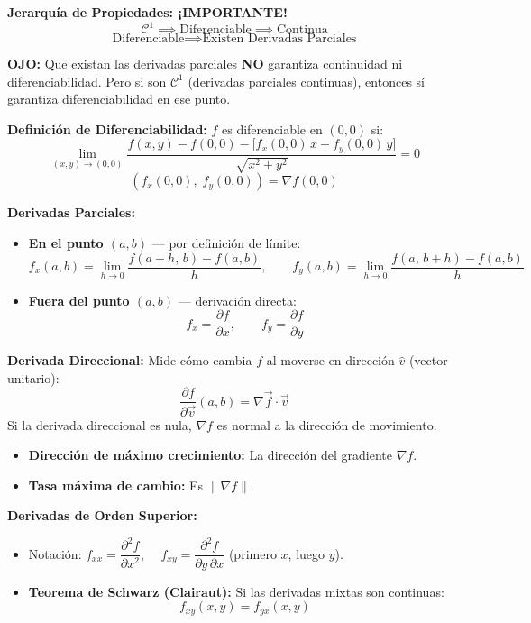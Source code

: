 \documentclass[letterpaper, 12pt]{article}
\newenvironment{seccionbox}[1]{%
    \begin{tcolorbox}[
        colback=celesteSuave,
        colframe=azulFuerte,
        coltitle=white,
        fonttitle=\bfseries\large,
        title=#1,
        arc=6pt,
        boxrule=1pt,
        breakable,
        enhanced,
        before upper={\parskip=4pt}
    ]
}{%
    \end{tcolorbox}
}
\newenvironment{notabox}{%
    \begin{tcolorbox}[
        colback=white,
        colframe=turquesaUsach,
        arc=4pt,
        boxrule=0.8pt,
        left=6pt, right=6pt, top=4pt, bottom=4pt
    ]
}{%
    \end{tcolorbox}
}
\begin{document}
\begin{seccionbox}{2. Diferenciabilidad y Derivadas}

\textbf{Jerarquía de Propiedades: \textcolor{turquesaUsach}{¡IMPORTANTE!}}
$$ \mathcal{C}^1 \implies \text{Diferenciable} \implies \text{Continua} $$
$$ \text{Diferenciable} \implies \text{Existen Derivadas Parciales} $$

\begin{notabox}
\textbf{\textcolor{rojoAviso}{OJO:}} Que existan las derivadas parciales \textbf{NO} garantiza continuidad ni diferenciabilidad. \textcolor{verdeOk}{Pero si son $\mathcal{C}^1$} (derivadas parciales continuas), entonces sí garantiza diferenciabilidad en ese punto.
\end{notabox}

\medskip
\textbf{Definición de Diferenciabilidad:} $f$ es diferenciable en $(0,0)$ si:
$$ \lim_{(x,y)\to(0,0)} \frac{f(x,y) - f(0,0) - \bigl[f_x(0,0)\,x + f_y(0,0)\,y\bigr]}{\sqrt{x^2+y^2}} = 0 $$
$$(f_x(0,0),\; f_y(0,0)) = \nabla f(0,0)$$

\medskip
\textbf{Derivadas Parciales:}
\begin{itemize}
    \item \textbf{En el punto $(a,b)$} — por definición de límite:
    $$ f_x(a,b) = \lim_{h\to 0} \frac{f(a+h,\,b) - f(a,b)}{h}, \qquad f_y(a,b) = \lim_{h\to 0} \frac{f(a,\,b+h) - f(a,b)}{h} $$
    \item \textbf{Fuera del punto $(a,b)$} — derivación directa:
    $$ f_x = \frac{\partial f}{\partial x}, \qquad f_y = \frac{\partial f}{\partial y} $$
\end{itemize}

\medskip
\textbf{Derivada Direccional:} Mide cómo cambia $f$ al moverse en dirección $\hat{v}$ (vector unitario):
$$ \frac{\partial f}{\partial \vec{v}}(a,b) = \nabla \vec{f} \cdot \vec{v} $$
Si la derivada direccional es nula, $\nabla f$ es normal a la dirección de movimiento.

\medskip
\begin{itemize}
    \item \textbf{Dirección de máximo crecimiento:} La dirección del gradiente $\nabla f$.
    \item \textbf{Tasa máxima de cambio:} Es $\|\nabla f\|$.
\end{itemize}

\medskip
\textbf{Derivadas de Orden Superior:}
\begin{itemize}
    \item Notación: $f_{xx} = \dfrac{\partial^2 f}{\partial x^2}$, $\quad f_{xy} = \dfrac{\partial^2 f}{\partial y\,\partial x}$ (primero $x$, luego $y$).
    \item \textbf{Teorema de Schwarz (Clairaut):} Si las derivadas mixtas son continuas:
    $$ f_{xy}(x,y) = f_{yx}(x,y) $$
\end{itemize}


\end{seccionbox}
\end{document}
